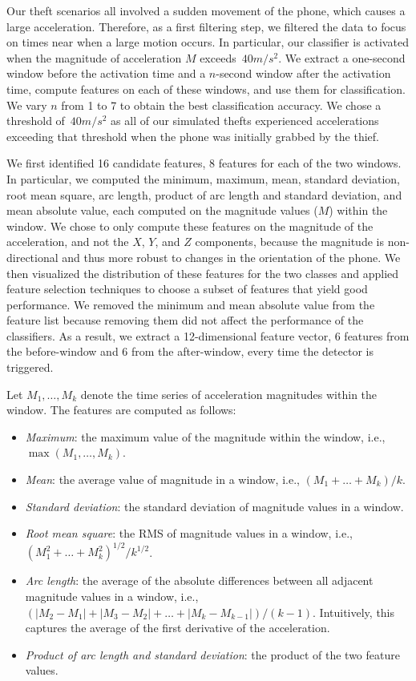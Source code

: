 Our theft scenarios all involved a sudden movement of the phone, which causes a large acceleration.
Therefore, as a first filtering step, we filtered the data to focus on times near when a large motion occurs.
In particular, our classifier is activated when the magnitude of acceleration $M$ exceeds~$40 m/s^2$.
We extract a one-second window before the activation time and a $n$-second window after the activation time, compute features on each of these windows, and use them for classification.
We vary $n$ from 1 to 7 to obtain the best classification accuracy.
We chose a threshold of~$40 m/s^2$ as all of our simulated thefts experienced accelerations exceeding that threshold when the phone was initially grabbed by the thief.

We first identified 16 candidate features, 8 features for each of the two windows.
In particular, we computed the minimum, maximum, mean, standard deviation, root mean square, arc length, product of arc length and standard deviation, and mean absolute value, each computed on the magnitude values ($M$) within the window.
We chose to only compute these features on the magnitude of the acceleration, and not the $X$, $Y$, and $Z$ components, because the magnitude is non-directional and thus more robust to changes in the orientation of the phone. 
We then visualized the distribution of these features for the two classes and applied feature selection techniques to choose a subset of features that yield good performance.
We removed the minimum and mean absolute value from the feature list because removing them did not affect the performance of the classifiers. 
As a result, we extract a 12-dimensional feature vector, 6 features from the before-window and 6 from the after-window, every time the detector is triggered.

Let $M_1,\dots,M_k$ denote the time series of acceleration magnitudes within the window.
The features are computed as follows:
\begin{itemize}
\item \emph{Maximum}: the maximum value of the magnitude within the window, i.e., $\max(M_1,\dots,M_k)$.
\item \emph{Mean}: the average value of magnitude in a window, i.e., $(M_1+\dots + M_k)/k$.
\item \emph{Standard deviation}: the standard deviation of magnitude values in a window.
\item \emph{Root mean square}: the RMS of magnitude values in a window, i.e., $(M_1^2 + \dots + M_k^2)^{1/2}/k^{1/2}$.
\item \emph{Arc length}: the average of the absolute differences between all adjacent magnitude values in a window, i.e., $(|M_2-M_1| + |M_3-M_2| + \dots + |M_k-M_{k-1}|)/(k-1)$.
Intuitively, this captures the average of the first derivative of the acceleration.
\item \emph{Product of arc length and standard deviation}: the product of the two feature values.
\end{itemize}

